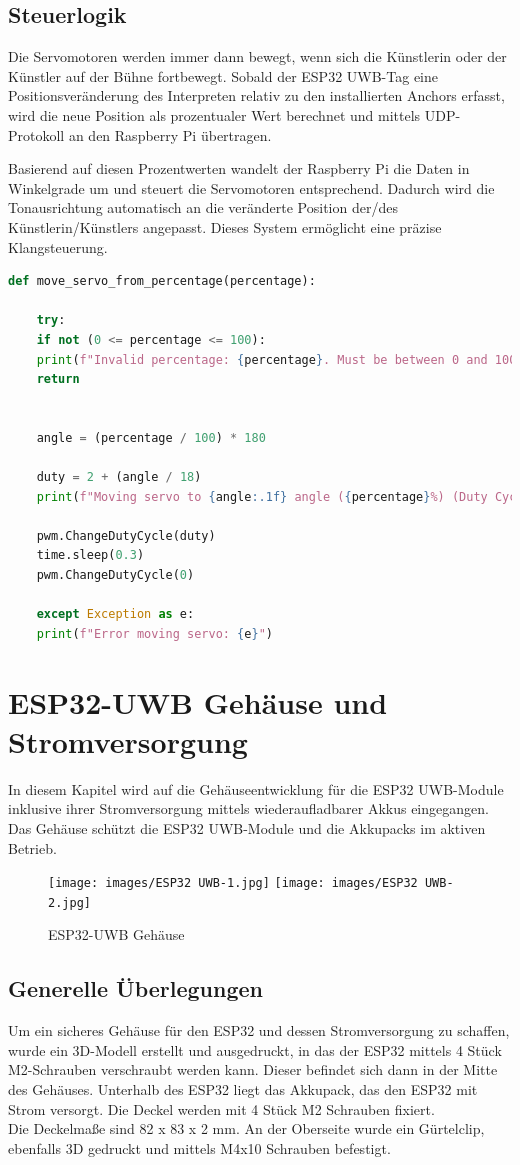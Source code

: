 \newpage
\subsection{Steuerlogik} \label{Steuerlogik}
Die Servomotoren werden immer dann bewegt, wenn sich die Künstlerin oder der Künstler auf der Bühne fortbewegt. Sobald der ESP32 UWB-Tag eine Positionsveränderung des Interpreten relativ zu den installierten Anchors erfasst, wird die neue Position als prozentualer Wert berechnet und mittels UDP-Protokoll an den Raspberry Pi übertragen.

Basierend auf diesen Prozentwerten wandelt der Raspberry Pi die Daten in Winkelgrade um und steuert die Servomotoren entsprechend. Dadurch wird die Tonausrichtung automatisch an die veränderte Position der/des Künstlerin/Künstlers angepasst. Dieses System ermöglicht eine präzise Klangsteuerung.

\begin{lstlisting}[language=Python]
	def move_servo_from_percentage(percentage):
	
	try:
	if not (0 <= percentage <= 100):
	print(f"Invalid percentage: {percentage}. Must be between 0 and 100.")
	return
	
	
	angle = (percentage / 100) * 180
	
	duty = 2 + (angle / 18)
	print(f"Moving servo to {angle:.1f} angle ({percentage}%) (Duty Cycle: {duty:.2f})")
	
	pwm.ChangeDutyCycle(duty)
	time.sleep(0.3)
	pwm.ChangeDutyCycle(0)
	
	except Exception as e:
	print(f"Error moving servo: {e}")
\end{lstlisting}

\newpage
\section{ESP32-UWB Gehäuse und Stromversorgung}
In diesem Kapitel wird auf die Gehäuseentwicklung für die ESP32 UWB-Module inklusive ihrer Stromversorgung mittels wiederaufladbarer Akkus eingegangen. Das Gehäuse schützt die ESP32 UWB-Module und die Akkupacks im aktiven Betrieb.

\begin{figure}[H]
	\centering
	\texttt{[image: images/ESP32 UWB-1.jpg]}
	\texttt{[image: images/ESP32 UWB-2.jpg]}
	\caption[ESP32-UWB Gehäuse]{ESP32-UWB Gehäuse}
	\label{fig:ESP32-UWB Gehäuse V2}
\end{figure}

\subsection{Generelle Überlegungen}
Um ein sicheres Gehäuse für den ESP32 und dessen Stromversorgung zu schaffen, wurde ein 3D-Modell erstellt und ausgedruckt, in das der ESP32 mittels 4 Stück M2-Schrauben verschraubt werden kann. Dieser befindet sich dann in der Mitte des Gehäuses. Unterhalb des ESP32 liegt das Akkupack, das den ESP32 mit Strom versorgt.
Die Deckel werden mit 4 Stück M2 Schrauben fixiert. \\
Die Deckelmaße sind 82 x 83 x 2 mm. An der Oberseite wurde ein Gürtelclip, ebenfalls 3D gedruckt und mittels M4x10 Schrauben befestigt.

